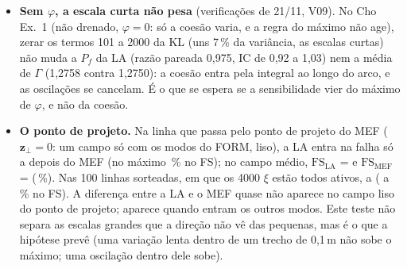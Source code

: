 \documentclass[11pt,a4paper]{article}
\begin{document}
\begin{itemize}
    o mesmo por outro caminho. No rebaixamento do Ceron, a V04 viu o mesmo efeito pelo outro lado: com os termos de
    escala curta (KL com $M = 10\,000$), o $\Gamma$ da LA sobe 0,45\,\% (mediana), ``pela regra do máximo''.
  \item \textbf{Sem $\varphi$, a escala curta não pesa} (verificações de 21/11, V09). No Cho Ex.~1 (não drenado,
    $\varphi = 0$: só a coesão varia, e a regra do máximo não age), zerar os termos 101 a 2000 da KL (uns 7\,\% da
    variância, as escalas curtas) não muda a $P_f$ da LA (razão pareada 0,975, IC de 0,92 a 1,03) nem a média de
    $\Gamma$ (1,2758 contra 1,2750): a coesão entra pela integral ao longo do arco, e as oscilações se cancelam. É o que
    se espera se a sensibilidade vier do máximo de $\varphi$, e não da coesão.
  \item \textbf{O ponto de projeto.} Na linha que passa pelo ponto de projeto do MEF ($\bm z_\perp = 0$: um campo só
    com os modos do FORM, liso), a LA entra na falha só \lmPtoDcMin{} a \lmPtoDcMax{} depois do MEF (no máximo
    \lmPtoFsMax\,\% no FS); no campo médio, $\mathrm{FS}_\text{LA}$ = \lmFsDetLa{} e $\mathrm{FS}_\text{MEF}$ =
    \lmFsDetMef{} (\lmDet\,\%). Nas 100 linhas sorteadas, em que os 4000 $\xi$ estão todos ativos, \lmLsDcRaMin{} a
    \lmLsDcRbMax{} (\lmLsDfsRaMin{} a \lmLsDfsRbMax\,\% no FS). A diferença entre a LA e o MEF quase não aparece no
    campo liso do ponto de projeto; aparece quando entram os outros modos. Este teste não separa as escalas grandes que a
    direção não vê das pequenas, mas é o que a hipótese prevê (uma variação lenta dentro de um trecho de 0,1\,m não sobe
    o máximo; uma oscilação dentro dele sobe).
\end{itemize}

\end{document}
